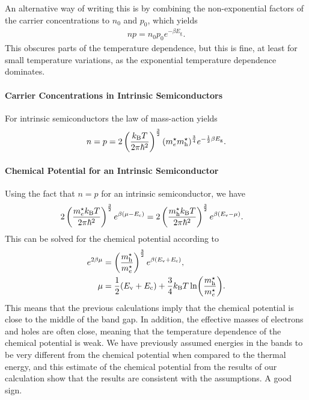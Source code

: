 An alternative way of writing this is by combining the non-exponential factors of the carrier concentrations to $n_{0}$ and $p_{0}$, which yields
\begin{align*}
	np = n_{0}p_{0}e^{-\beta E_{\text{g}}}.
\end{align*}
This obscures parts of the temperature dependence, but this is fine, at least for small temperature variations, as the exponential temperature dependence dominates.

\paragraph{Carrier Concentrations in Intrinsic Semiconductors}
For intrinsic semiconductors the law of mass-action yields
\begin{align*}
	n = p = 2\left(\frac{k_{\text{B}} T}{2\pi\hbar^{2}}\right)^{\frac{3}{2}}(m^{\star}_{e}m^{\star}_{\text{h}})^{\frac{3}{4}}e^{-\frac{1}{2}\beta E_{\text{g}}}.
\end{align*}

\paragraph{Chemical Potential for an Intrinsic Semiconductor}
Using the fact that $n = p$ for an intrinsic semiconductor, we have
\begin{align*}
	2\left(\frac{m^{\star}_{e}k_{\text{B}} T}{2\pi\hbar^{2}}\right)^{\frac{3}{2}}e^{\beta(\mu - E_{\text{c}})} &= 2\left(\frac{m^{\star}_{\text{h}}k_{\text{B}} T}{2\pi\hbar^{2}}\right)^{\frac{3}{2}}e^{\beta(E_{\text{v}} - \mu)}.
\end{align*}
This can be solved for the chemical potential according to
\begin{align*}
	e^{2\beta\mu} &= \left(\frac{m^{\star}_{\text{h}}}{m^{\star}_{e}}\right)^{\frac{3}{2}}e^{\beta(E_{\text{v}} + E_{\text{c}})}, \\
	\mu           &= \frac{1}{2}(E_{\text{v}} + E_{\text{c}}) + \frac{3}{4}k_{\text{B}} T\ln(\frac{m^{\star}_{\text{h}}}{m^{\star}_{e}}).
\end{align*}
This means that the previous calculations imply that the chemical potential is close to the middle of the band gap. In addition, the effective masses of electrons and holes are often close, meaning that the temperature dependence of the chemical potential is weak. We have previously assumed energies in the bands to be very different from the chemical potential when compared to the thermal energy, and this estimate of the chemical potential from the results of our calculation show that the results are consistent with the assumptions. A good sign.

